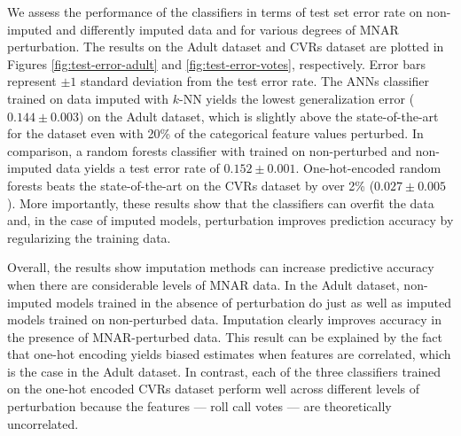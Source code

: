 \documentclass[10pt]{book}
\theoremstyle{definition}
\begin{document}
\par
{}

We assess the performance of the classifiers in terms of test set error rate on non-imputed and differently imputed data and for various degrees of MNAR perturbation. The results on the Adult dataset and CVRs dataset are plotted in Figures \ref{fig:test-error-adult} and \ref{fig:test-error-votes}, respectively. Error bars represent $\pm 1$ standard deviation from the test error rate. The ANNs classifier trained on data imputed with $k$-NN yields the lowest generalization error ($0.144 \pm 0.003$) on the Adult dataset, which is slightly above the state-of-the-art for the dataset even with 20\% of the categorical feature values perturbed. In comparison, a random forests classifier with trained on non-perturbed and non-imputed data yields a test error rate of $0.152 \pm 0.001$. One-hot-encoded random forests beats the state-of-the-art on the CVRs dataset by over 2\% ($0.027 \pm 0.005$). More importantly, these results show that the classifiers can overfit the data and, in the case of imputed models, perturbation improves prediction accuracy by regularizing the training data. 

Overall, the results show imputation methods can increase predictive accuracy when there are considerable levels of MNAR data. In the Adult dataset, non-imputed models trained in the absence of perturbation do just as well as imputed models trained on non-perturbed data. Imputation clearly improves accuracy in the presence of MNAR-perturbed data. This result can be explained by the fact that one-hot encoding yields biased estimates when features are correlated, which is the case in the Adult dataset. In contrast, each of the three classifiers trained on the one-hot encoded CVRs dataset perform well across different levels of perturbation because the features --- roll call votes --- are theoretically uncorrelated.%
\end{document}
